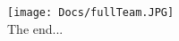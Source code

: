 \documentclass{article}
\begin{document}
  

  

  \centering
  \texttt{[image: Docs/fullTeam.JPG]} \\
  {\Huge The end...\\}
  
\end{document}
